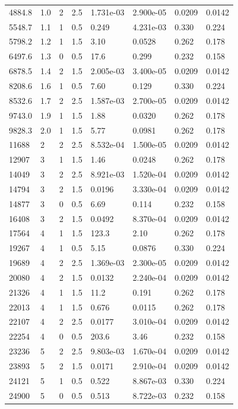 \documentclass[preview]{standalone}
\begin{document}
{{\begin{tabular}{L{1.2cm}C{1.2cm} C{0.3cm}C{0.5cm} C{1.4cm}C{1.4cm} C{1.4cm}C{1.4cm}}
  4884.8  &   1.0  & 2     & 2.5 &  1.731e-03  & 2.900e-05  & 0.0209 &  0.0142   \\ 
  5548.7  &   1.1  & 1     & 0.5 &  0.249  & 4.231e-03  & 0.330 &  0.224   \\ 
  5798.2  &   1.2  & 1     & 1.5 &  3.10  & 0.0528  & 0.262 &  0.178   \\ 
  6497.6  &   1.3  & 0     & 0.5 &  17.6  & 0.299  & 0.232 &  0.158   \\ 
  6878.5  &   1.4  & 2     & 1.5 &  2.005e-03  & 3.400e-05  & 0.0209 &  0.0142   \\ 
  8208.6  &   1.6  & 1     & 0.5 &  7.60  & 0.129  & 0.330 &  0.224   \\ 
  8532.6  &   1.7  & 2     & 2.5 &  1.587e-03  & 2.700e-05  & 0.0209 &  0.0142   \\ 
  9743.0  &   1.9  & 1     & 1.5 &  1.88  & 0.0320  & 0.262 &  0.178   \\ 
  9828.3  &   2.0  & 1     & 1.5 &  5.77  & 0.0981  & 0.262 &  0.178   \\ 
  11688  &     2  & 2     & 2.5 &  8.532e-04  & 1.500e-05  & 0.0209 &  0.0142   \\ 
  12907  &     3  & 1     & 1.5 &  1.46  & 0.0248  & 0.262 &  0.178   \\ 
  14049  &     3  & 2     & 2.5 &  8.921e-03  & 1.520e-04  & 0.0209 &  0.0142   \\ 
  14794  &     3  & 2     & 1.5 &  0.0196  & 3.330e-04  & 0.0209 &  0.0142   \\ 
  14877  &     3  & 0     & 0.5 &  6.69  & 0.114  & 0.232 &  0.158   \\ 
  16408  &     3  & 2     & 1.5 &  0.0492  & 8.370e-04  & 0.0209 &  0.0142   \\ 
  17564  &     4  & 1     & 1.5 &  123.3  & 2.10  & 0.262 &  0.178   \\ 
  19267  &     4  & 1     & 0.5 &  5.15  & 0.0876  & 0.330 &  0.224   \\ 
  19689  &     4  & 2     & 2.5 &  1.369e-03  & 2.300e-05  & 0.0209 &  0.0142   \\ 
  20080  &     4  & 2     & 1.5 &  0.0132  & 2.240e-04  & 0.0209 &  0.0142   \\ 
  21326  &     4  & 1     & 1.5 &  11.2  & 0.191  & 0.262 &  0.178   \\ 
  22013  &     4  & 1     & 1.5 &  0.676  & 0.0115  & 0.262 &  0.178   \\ 
  22107  &     4  & 2     & 2.5 &  0.0177  & 3.010e-04  & 0.0209 &  0.0142   \\ 
  22254  &     4  & 0     & 0.5 &  203.6  & 3.46  & 0.232 &  0.158   \\ 
  23236  &     5  & 2     & 2.5 &  9.803e-03  & 1.670e-04  & 0.0209 &  0.0142   \\ 
  23893  &     5  & 2     & 1.5 &  0.0171  & 2.910e-04  & 0.0209 &  0.0142   \\ 
  24121  &     5  & 1     & 0.5 &  0.522  & 8.867e-03  & 0.330 &  0.224   \\ 
  24900  &     5  & 0     & 0.5 &  0.513  & 8.722e-03  & 0.232 &  0.158   \\ 
\hline 
\end{tabular} 

}}
\end{document}
